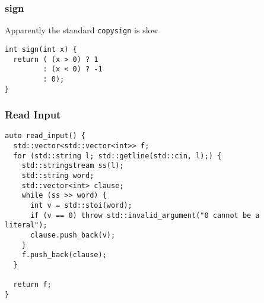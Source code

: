 \documentclass[10pt,AMS Euler]{article}
\begin{document}
\subsubsection*{sign}
\label{sec:org4d0b854}
Apparently the standard \texttt{copysign} is slow
\begin{verbatim}
int sign(int x) {
  return ( (x > 0) ? 1
         : (x < 0) ? -1
         : 0);
}
\end{verbatim}
\subsubsection*{Read Input}
\label{sec:orgb2c67e5}
\begin{verbatim}
auto read_input() {
  std::vector<std::vector<int>> f;
  for (std::string l; std::getline(std::cin, l);) {
    std::stringstream ss(l);
    std::string word;
    std::vector<int> clause;
    while (ss >> word) {
      int v = std::stoi(word);
      if (v == 0) throw std::invalid_argument("0 cannot be a literal");
      clause.push_back(v);
    }
    f.push_back(clause);
  }
  
  return f;
}
\end{verbatim}



\end{document}
